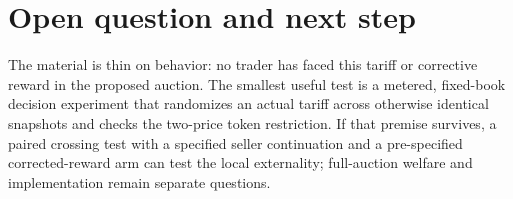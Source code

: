 \documentclass{article}
\begin{document}
\section*{Open question and next step}

The material is thin on behavior: no trader has faced this tariff or corrective reward in the proposed auction. The smallest useful test is a metered, fixed-book decision experiment that randomizes an actual tariff across otherwise identical snapshots and checks the two-price token restriction. If that premise survives, a paired crossing test with a specified seller continuation and a pre-specified corrected-reward arm can test the local externality; full-auction welfare and implementation remain separate questions. 
\end{document}
